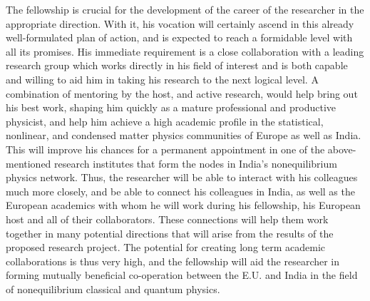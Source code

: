 \documentclass[a4paper,11pt,color]{article}
\begin{document}
The fellowship is crucial for the development of the career of the researcher in the appropriate direction. With it, his vocation will certainly ascend in this already well-formulated plan of action, and is expected to  reach a formidable level with all its promises. His immediate requirement is a close collaboration with a leading research group which works directly in his field of interest and is both capable and willing to aid him in taking his research to the next logical level. A combination of mentoring by the host, and active research, would help bring out his best work, shaping him quickly as a mature professional and productive physicist, and help him achieve a high academic profile in the statistical, nonlinear, and condensed matter physics communities of Europe as well as India. This will improve his chances for a permanent appointment in one of the above-mentioned research institutes that form the nodes in India's nonequilibrium physics network. Thus, the researcher will be able to interact with 
his colleagues much more closely, and be able to connect his colleagues in India, as well as the European academics with whom he will work during his fellowship, his European host and all of their collaborators. These connections will help them work together in many potential directions that will arise from the results of the proposed research project. The potential for creating long term academic collaborations is thus very high, and the fellowship will aid the researcher in forming mutually beneficial co-operation between the E.U. and India in the field of nonequilibrium classical and quantum physics.
\end{document}
